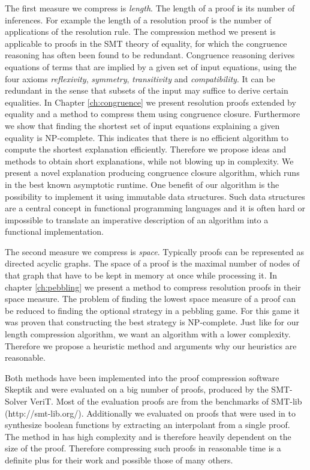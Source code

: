 The first measure we compress is \emph{length}.
The length of a proof is its number of inferences.
For example the length of a resolution proof is the number of applications of the resolution rule.
The compression method we present is applicable to proofs in the SMT theory of equality, for which the congruence reasoning has often been found to be redundant.
Congruence reasoning derives equations of terms that are implied by a given set of input equations, 
using the four axioms \emph{reflexivity}, \emph{symmetry}, \emph{transitivity} and \emph{compatibility}. 
It can be redundant in the sense that subsets of the input may suffice to derive certain equalities.
In Chapter \ref{ch:congruence} we present resolution proofs extended by equality and a method to compress them using congruence closure.
Furthermore we show that finding the shortest set of input equations explaining a given equality is NP-complete.
This indicates that there is no efficient algorithm to compute the shortest explanation efficiently.
Therefore we propose ideas and methods to obtain short explanations, while not blowing up in complexity.
We present a novel explanation producing congruence closure algorithm, which runs in the best known asymptotic runtime.
One benefit of our algorithm is the possibility to implement it using immutable data structures.
Such data structures are a central concept in functional programming languages and it is often hard or impossible to translate an imperative description of an algorithm into a functional implementation.

The second measure we compress is \emph{space}.
Typically proofs can be represented as directed acyclic graphs.
The space of a proof is the maximal number of nodes of that graph that have to be kept in memory at once while processing it.
In chapter \ref{ch:pebbling} we present a method to compress resolution proofs in their space measure.
The problem of finding the lowest space measure of a proof can be reduced to finding the optional strategy in a pebbling game.
For this game it was proven that constructing the best strategy is NP-complete.
Just like for our length compression algorithm, we want an algorithm with a lower complexity.
Therefore we propose a heuristic method and arguments why our heuristics are reasonable.

Both methods have been implemented into the proof compression software Skeptik and were evaluated on a big number of proofs, produced by the SMT-Solver VeriT.
Most of the evaluation proofs are from the benchmarks of SMT-lib (http://smt-lib.org/).
Additionally we evaluated on proofs that were used in \cite{Hofferek2013} to synthesize boolean functions by extracting an interpolant from a single proof.
The method in \cite{Hofferek2013} has high complexity and is therefore heavily dependent on the size of the proof.
Therefore compressing such proofs in reasonable time is a definite plus for their work and possible those of many others.

